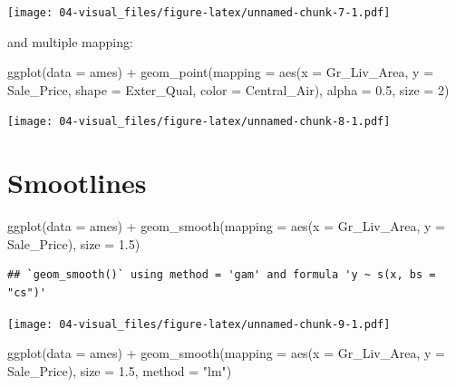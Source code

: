 \documentclass[
]{book}
\newenvironment{Shaded}{\begin{snugshade}}{\end{snugshade}}
\newcommand{\AttributeTok}[1]{\textcolor[rgb]{0.77,0.63,0.00}{#1}}
\newcommand{\DecValTok}[1]{\textcolor[rgb]{0.00,0.00,0.81}{#1}}
\newcommand{\FloatTok}[1]{\textcolor[rgb]{0.00,0.00,0.81}{#1}}
\newcommand{\FunctionTok}[1]{\textcolor[rgb]{0.00,0.00,0.00}{#1}}
\newcommand{\NormalTok}[1]{#1}
\newcommand{\SpecialCharTok}[1]{\textcolor[rgb]{0.00,0.00,0.00}{#1}}
\newcommand{\StringTok}[1]{\textcolor[rgb]{0.31,0.60,0.02}{#1}}
\begin{document}
\texttt{[image: 04-visual\_files/figure-latex/unnamed-chunk-7-1.pdf]}

and multiple mapping:

\begin{Shaded}
\begin{Highlighting}[]
\FunctionTok{ggplot}\NormalTok{(}\AttributeTok{data =}\NormalTok{ ames) }\SpecialCharTok{+} 
  \FunctionTok{geom\_point}\NormalTok{(}\AttributeTok{mapping =} \FunctionTok{aes}\NormalTok{(}\AttributeTok{x =}\NormalTok{ Gr\_Liv\_Area, }
                           \AttributeTok{y =}\NormalTok{ Sale\_Price, }
                           \AttributeTok{shape =}\NormalTok{ Exter\_Qual,}
                           \AttributeTok{color =}\NormalTok{ Central\_Air), }
             \AttributeTok{alpha =} \FloatTok{0.5}\NormalTok{,}
             \AttributeTok{size =} \DecValTok{2}\NormalTok{)}
\end{Highlighting}
\end{Shaded}

\texttt{[image: 04-visual\_files/figure-latex/unnamed-chunk-8-1.pdf]}

\hypertarget{smootlines}{%
\section{Smootlines}\label{smootlines}}

\begin{Shaded}
\begin{Highlighting}[]
\FunctionTok{ggplot}\NormalTok{(}\AttributeTok{data =}\NormalTok{ ames) }\SpecialCharTok{+} 
  \FunctionTok{geom\_smooth}\NormalTok{(}\AttributeTok{mapping =} \FunctionTok{aes}\NormalTok{(}\AttributeTok{x =}\NormalTok{ Gr\_Liv\_Area, }
                           \AttributeTok{y =}\NormalTok{ Sale\_Price), }
              \AttributeTok{size =} \FloatTok{1.5}\NormalTok{)}
\end{Highlighting}
\end{Shaded}

\begin{verbatim}
## `geom_smooth()` using method = 'gam' and formula 'y ~ s(x, bs = "cs")'
\end{verbatim}

\texttt{[image: 04-visual\_files/figure-latex/unnamed-chunk-9-1.pdf]}

\begin{Shaded}
\begin{Highlighting}[]
\FunctionTok{ggplot}\NormalTok{(}\AttributeTok{data =}\NormalTok{ ames) }\SpecialCharTok{+} 
  \FunctionTok{geom\_smooth}\NormalTok{(}\AttributeTok{mapping =} \FunctionTok{aes}\NormalTok{(}\AttributeTok{x =}\NormalTok{ Gr\_Liv\_Area, }
                           \AttributeTok{y =}\NormalTok{ Sale\_Price), }
              \AttributeTok{size =} \FloatTok{1.5}\NormalTok{,}
              \AttributeTok{method =} \StringTok{"lm"}\NormalTok{)}
\end{Highlighting}
\end{Shaded}
\end{document}
